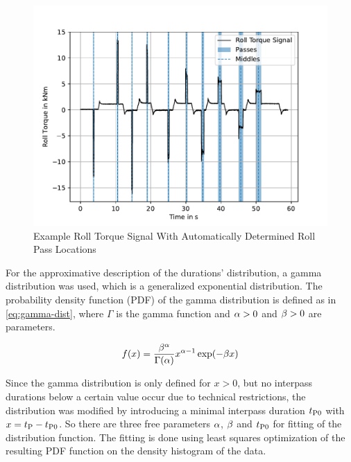 \begin{figure}
    \centering
    \includegraphics{img/plot_timeline_pass_finding}
    \caption{Example Roll Torque Signal With Automatically Determined Roll Pass Locations}
    \label{fig:plot_timeline_pass_finding}
\end{figure}


For the approximative description of the durations' distribution, a gamma distribution was used, which is a generalized exponential distribution.
The probability density function (PDF) of the gamma distribution is defined as in \autoref{eq:gamma-dist}, where $\Gamma$ is the gamma function and ${\alpha} > 0$ and ${\beta} > 0$ are parameters.

\begin{equation}
    f(x) = \frac{{\beta}^{\alpha}}{\Gamma({\alpha})}x^{{\alpha} - 1} \exp(-{\beta} x)
    \label{eq:gamma-dist}
\end{equation}

Since the gamma distribution is only defined for $x>0$, but no interpass durations below a certain value occur due to technical restrictions, the distribution was modified by introducing a minimal interpass duration ${t_\mathrm{P0}}$ with $x = {t_\mathrm{P}} - {t_\mathrm{P0}}$.
So there are three free parameters ${\alpha}$, ${\beta}$ and ${t_\mathrm{P0}}$ for fitting of the distribution function.
The fitting is done using least squares optimization of the resulting PDF function on the density histogram of the data.

